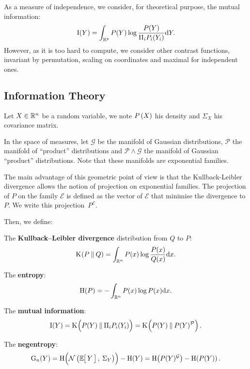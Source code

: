 \documentclass[a4paper]{article}
\newcommand{\Kl}[3][]{\mathrm K_{#1}\!\zp{#2\:\|\:#3}}
\newcommand{\zZ}[2]{\mathrm #1\!\zp{#2}}
\newcommand{\zD}{\mathcal}
\newcommand{\Ng}[2]{\mathcal{N}\zp{#1,\:#2}}
\begin{document}
As a measure of independence, we consider, for theoretical purpose,
the mutual information:\begin{equation}
  \zZ IY = \int_{\zR^p} P(Y) \log\frac{P(Y)}{\Pi_i P_i(Y_i)} \zdx Y.
\end{equation}
However, as it is too hard to compute, we consider other contrast functions, invariant by permutation, scaling on coordinates and maximal for independent ones.



\subsection{Information Theory}
\label{infth}
Let $X\in\mathbb{R}^n$ be a random variable, we note $P\zp{X}$ his density and $\Sigma_X$ his covariance matrix.
\znl

In the space of measures, let $\zD G$ be the manifold of Gaussian distributions, $\zD P$ the manifold of ``product'' distributions and $\zD P\wedge\zD G$ the manifold of Gaussian ``product'' distributions. Note that these manifolds are exponential families.

The main advantage of this geometric point of view is that the Kullback-Leibler divergence allows the notion of projection on exponential families. The projection of $P$ on the family $\zD E$ is defined as the vector of $\zD E$ that minimise the divergence to $P$. We write this projection~$P^{\zD E}$.
\znl

Then, we define:

The \textbf{Kullback--Leibler divergence} distribution from $Q$ to $P$:
\begin{equation}
  \Kl PQ = \int_{\zR^n} P(x) \log\frac{P(x)}{Q(x)} \zdx x.
\end{equation}

The \textbf{entropy}:\begin{equation}
  \zZ HP = - \int_{\zR^n} P(x)\log P(x) \zdx x.
\end{equation}

The \textbf{mutual information}:
\begin{equation}
  \zZ IY = \Kl {\zpbig2 P(Y)}{\Pi_i P_i(Y_i)} = \Kl {\zpbig2 P(Y)}{P(Y)^{\zD P}}.
\end{equation}

The \textbf{negentropy}:
\begin{equation}
  \mathrm{G}_n(Y) = \zZ H{\Ng{\zesp Y}{\Sigma_Y}\zpbig2}-\zZ HY= \zZ H{P(Y)^{\zD G}}-\zZ H{P(Y)}.
\end{equation}
\end{document}
